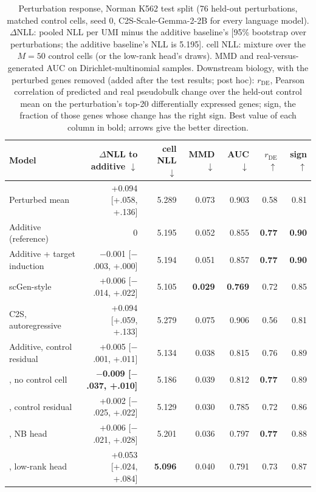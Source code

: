 \begin{table}[t]
\centering
\setlength{\tabcolsep}{4pt}
\begin{tabular}{lrrrrrr}
\toprule
Model & $\Delta$NLL to additive $\downarrow$ & cell NLL $\downarrow$ & MMD $\downarrow$ & AUC $\downarrow$ & $r_{\mathrm{DE}}$ $\uparrow$ & sign $\uparrow$ \\
\midrule
Perturbed mean & +0.094 [+.058, +.136] & 5.289 & 0.073 & 0.903 & 0.58 & 0.81 \\
Additive (reference) & 0 & 5.195 & 0.052 & 0.855 & \textbf{0.77} & \textbf{0.90} \\
Additive + target induction & $-$0.001 [$-$.003, +.000] & 5.194 & 0.051 & 0.857 & \textbf{0.77} & \textbf{0.90} \\
scGen-style & +0.006 [$-$.014, +.022] & 5.105 & \textbf{0.029} & \textbf{0.769} & 0.72 & 0.85 \\
C2S, autoregressive & +0.094 [+.059, +.133] & 5.279 & 0.075 & 0.906 & 0.56 & 0.81 \\
Additive, control residual & +0.005 [$-$.001, +.011] & 5.134 & 0.038 & 0.815 & 0.76 & 0.89 \\
\rowcolor{ours}\cad{}, no control cell & \textbf{$-$0.009 [$-$.037, +.010]} & 5.186 & 0.039 & 0.812 & \textbf{0.77} & 0.89 \\
\rowcolor{ours}\cad{}, control residual & +0.002 [$-$.025, +.022] & 5.129 & 0.030 & 0.785 & 0.72 & 0.86 \\
\rowcolor{ours}\cad{}, NB head & +0.006 [$-$.021, +.028] & 5.201 & 0.036 & 0.797 & \textbf{0.77} & 0.88 \\
\rowcolor{ours}\cad{}, low-rank head & +0.053 [+.024, +.084] & \textbf{5.096} & 0.040 & 0.791 & 0.73 & 0.87 \\
\bottomrule
\end{tabular}
\caption{Perturbation response, Norman K562 test split (76 held-out perturbations, matched control cells, seed 0, C2S-Scale-Gemma-2-2B for every language model). $\Delta$NLL: pooled NLL per UMI minus the additive baseline's [95\% bootstrap over perturbations; the additive baseline's NLL is 5.195]. cell NLL: mixture over the $M=50$ control cells (or the low-rank head's draws). MMD and real-versus-generated AUC on Dirichlet-multinomial samples. Downstream biology, with the perturbed genes removed (added after the test results; post hoc): $r_{\mathrm{DE}}$, Pearson correlation of predicted and real pseudobulk change over the held-out control mean on the perturbation's top-20 differentially expressed genes; sign, the fraction of those genes whose change has the right sign. Best value of each column in bold; arrows give the better direction.}
\label{tab:norman_main}
\end{table}
